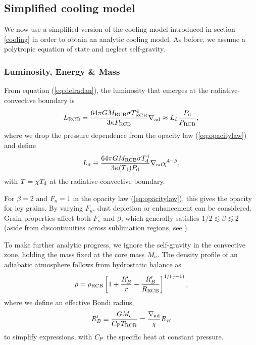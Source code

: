 \documentclass[apj]{emulateapj}
\newcommand{\delad}{\nabla_{\rm ad}}
\newcommand{\co}{_{\rm c}}
\newcommand{\di}{_{\rm d}}
\newcommand{\cb}{_{\rm RCB}}
\begin{document}
\subsection{Simplified cooling model}
\label{coolingan}
We now use a simplified version of the cooling model introduced in section \ref{cooling} in order to obtain an analytic cooling model. As before, we assume a polytropic equation of state and neglect self-gravity.

\subsubsection{Luminosity,  Energy \& Mass}
From equation (\ref{eq:delradan}), the luminosity that emerges at the radiative-convective boundary is
\begin{equation} \label{eq:Lcb}
L\cb = {64 \pi G M\cb \sigma T\cb^4 \over 3 \kappa P\cb } \nabla_{\rm ad} \approx L\di {P_{\rm d} \over P\cb}, %
\end{equation} 
where we drop the pressure dependence from the opacity law (\ref{eq:opacitylaw}) and define 
\begin{equation} 
L\di \equiv {64 \pi G M\cb \sigma T_{\rm d}^4 \over 3 \kappa(T_{\rm d}) P_{\rm d}} \nabla_{\rm ad}\chi^{4-\beta}, 
\end{equation} 
with $T = \chi T_{\rm d}$ at the radiative-convective boundary.

 For $\beta = 2$ and $F_\kappa = 1$ in the opacity law (\ref{eq:opacitylaw}), this gives the \citet{bell94} opacity for icy grains.  By varying $F_\kappa$, dust depletion or enhancement can be considered.  Grain properties affect both $F_\kappa$ and $\beta$, which generally satisfies  $1/2 \lesssim \beta \lesssim 2$ (aside from discontinuities across sublimation regions, see \citealt{semenov03}).

To make further analytic progress, we ignore the self-gravity in the convective zone, holding the mass fixed at the core mass $M\co$.  The density profile of an adiabatic atmosphere follows from hydrostatic balance as 
\begin{equation}\label{eq:rhoconv} 
\rho = \rho\cb \left[ 1 + {R_B' \over r} - {R_B' \over R\cb}  \right]^{1/(\gamma -1)},
\end{equation} 
where we define an effective Bondi radius,
\begin{equation}
R_B' \equiv {G M\co \over C_{\rm P} T\cb} = {\delad \over \chi} R_B
\end{equation} 
to simplify expressions, with $C_{\rm P}$ the specific heat at constant pressure.
\end{document}
